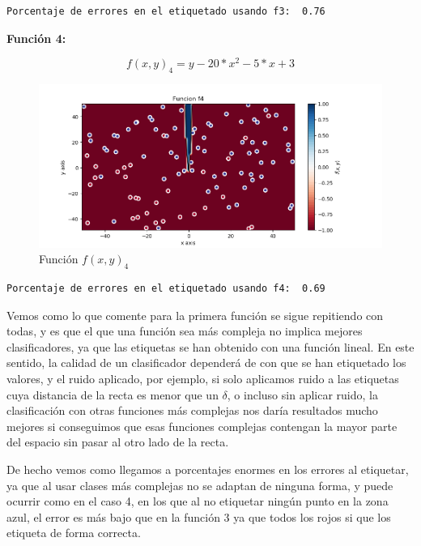 \documentclass[12pt, spanish]{article}
\begin{document}
\begin{lstlisting}
Porcentaje de errores en el etiquetado usando f3:  0.76
\end{lstlisting}


\textbf{Función 4:} 

$$ f(x, y)_4 = y - 20*x^2 -5*x +3  $$

\begin{figure}[H]
  \centering
      \includegraphics[scale = 0.70]{ej1-3-f4.png}
 		 \caption{Función $f(x, y)_4$}
  		\label{fig:ej1-f4}

\end{figure}

\begin{lstlisting}
Porcentaje de errores en el etiquetado usando f4:  0.69
\end{lstlisting}


Vemos como lo que comente para la primera función se sigue repitiendo con todas, y es que el que una función sea más compleja no implica mejores clasificadores, ya que las etiquetas se han obtenido con una función lineal. En este sentido, la calidad de un clasificador dependerá de con que se han etiquetado los valores, y el ruido aplicado, por ejemplo, si solo aplicamos ruido a las etiquetas cuya distancia de la recta es menor que un $\delta$, o incluso sin aplicar ruido,  la clasificación con otras funciones más complejas nos daría resultados mucho mejores si conseguimos que esas funciones complejas contengan la mayor parte del espacio sin pasar al otro lado de la recta.

De hecho vemos como llegamos a porcentajes enormes en los errores al etiquetar, ya que al usar clases más complejas no se adaptan de ninguna forma, y puede ocurrir como en el caso 4, en los que al no etiquetar ningún punto en la zona azul, el error es más bajo que en la función 3 ya que todos los rojos si que los etiqueta de forma correcta.
\end{document}
